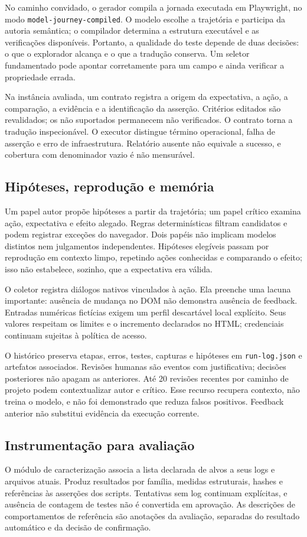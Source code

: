 \documentclass[12pt]{article}
\begin{document}
No caminho convidado, o gerador compila a jornada executada em Playwright, no modo \texttt{model-journey-compiled}. O modelo escolhe a trajetória e participa da autoria semântica; o compilador determina a estrutura executável e as verificações disponíveis. Portanto, a qualidade do teste depende de duas decisões: o que o explorador alcança e o que a tradução conserva. Um seletor fundamentado pode apontar corretamente para um campo e ainda verificar a propriedade errada.

Na instância avaliada, um contrato registra a origem da expectativa, a ação, a comparação, a evidência e a identificação da asserção. Critérios editados são revalidados; os não suportados permanecem não verificados. O contrato torna a tradução inspecionável. O executor distingue término operacional, falha de asserção e erro de infraestrutura. Relatório ausente não equivale a sucesso, e cobertura com denominador vazio é não mensurável.

\subsection{Hipóteses, reprodução e memória}
Um papel autor propõe hipóteses a partir da trajetória; um papel crítico examina ação, expectativa e efeito alegado. Regras determinísticas filtram candidatos e podem registrar exceções do navegador. Dois papéis não implicam modelos distintos nem julgamentos independentes. Hipóteses elegíveis passam por reprodução em contexto limpo, repetindo ações conhecidas e comparando o efeito; isso não estabelece, sozinho, que a expectativa era válida.

O coletor registra diálogos nativos vinculados à ação. Ela preenche uma lacuna importante: ausência de mudança no DOM não demonstra ausência de feedback. Entradas numéricas fictícias exigem um perfil descartável local explícito. Seus valores respeitam os limites e o incremento declarados no HTML; credenciais continuam sujeitas à política de acesso.

O histórico preserva etapas, erros, testes, capturas e hipóteses em \texttt{run-log.json} e artefatos associados. Revisões humanas são eventos com justificativa; decisões posteriores não apagam as anteriores. Até 20 revisões recentes por caminho de projeto podem contextualizar autor e crítico. Esse recurso recupera contexto, não treina o modelo, e não foi demonstrado que reduza falsos positivos. Feedback anterior não substitui evidência da execução corrente.

\subsection{Instrumentação para avaliação}
O módulo de caracterização associa a lista declarada de alvos a seus logs e arquivos atuais. Produz resultados por família, medidas estruturais, hashes e referências às asserções dos scripts. Tentativas sem log continuam explícitas, e ausência de contagem de testes não é convertida em aprovação. As descrições de comportamentos de referência são anotações da avaliação, separadas do resultado automático e da decisão de confirmação.
\end{document}
